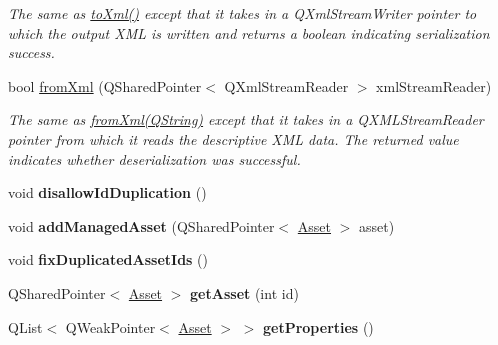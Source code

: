 \begin{DoxyCompactItemize}
\begin{DoxyCompactList}\small\item\em The same as \hyperlink{class_picto_1_1_serializable_a2715cc957dfee3198e54643f546eba26}{to\-Xml()} except that it takes in a Q\-Xml\-Stream\-Writer pointer to which the output X\-M\-L is written and returns a boolean indicating serialization success. \end{DoxyCompactList}\item 
\hypertarget{class_picto_1_1_design_config_aad616a86845e1738d408c87d472cbe48}{bool \hyperlink{class_picto_1_1_design_config_aad616a86845e1738d408c87d472cbe48}{from\-Xml} (Q\-Shared\-Pointer$<$ Q\-Xml\-Stream\-Reader $>$ xml\-Stream\-Reader)}\label{class_picto_1_1_design_config_aad616a86845e1738d408c87d472cbe48}

\begin{DoxyCompactList}\small\item\em The same as \hyperlink{class_picto_1_1_serializable_acbaf02a158b3440a16bc1a84ebaa4481}{from\-Xml(\-Q\-String)} except that it takes in a Q\-X\-M\-L\-Stream\-Reader pointer from which it reads the descriptive X\-M\-L data. The returned value indicates whether deserialization was successful. \end{DoxyCompactList}\item 
\hypertarget{class_picto_1_1_design_config_aea640b40ee7993dccb6855c5e7d58eb7}{void {\bfseries disallow\-Id\-Duplication} ()}\label{class_picto_1_1_design_config_aea640b40ee7993dccb6855c5e7d58eb7}

\item 
\hypertarget{class_picto_1_1_design_config_a3e63a2b632f2b50c33b9d26dac28a0c3}{void {\bfseries add\-Managed\-Asset} (Q\-Shared\-Pointer$<$ \hyperlink{class_picto_1_1_asset}{Asset} $>$ asset)}\label{class_picto_1_1_design_config_a3e63a2b632f2b50c33b9d26dac28a0c3}

\item 
\hypertarget{class_picto_1_1_design_config_ab736f3c1e3181b5fe357c369674f5676}{void {\bfseries fix\-Duplicated\-Asset\-Ids} ()}\label{class_picto_1_1_design_config_ab736f3c1e3181b5fe357c369674f5676}

\item 
\hypertarget{class_picto_1_1_design_config_aa199a529f8260334f5a7a965c9861865}{Q\-Shared\-Pointer$<$ \hyperlink{class_picto_1_1_asset}{Asset} $>$ {\bfseries get\-Asset} (int id)}\label{class_picto_1_1_design_config_aa199a529f8260334f5a7a965c9861865}

\item 
\hypertarget{class_picto_1_1_design_config_a023e4e41d8bd724ffd3885c4487d1ed7}{Q\-List$<$ Q\-Weak\-Pointer$<$ \hyperlink{class_picto_1_1_asset}{Asset} $>$ $>$ {\bfseries get\-Properties} ()}\label{class_picto_1_1_design_config_a023e4e41d8bd724ffd3885c4487d1ed7}


\end{DoxyCompactItemize}
